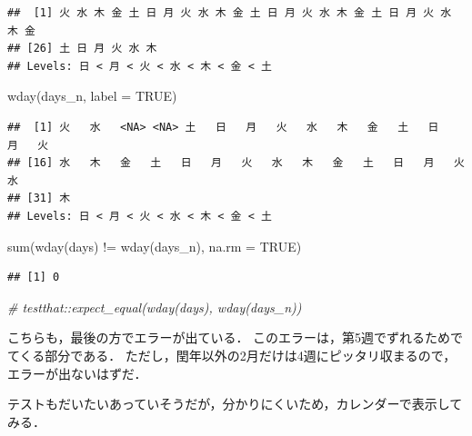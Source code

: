 \documentclass[
]{article}
\newenvironment{Shaded}{\begin{snugshade}}{\end{snugshade}}
\newcommand{\AttributeTok}[1]{\textcolor[rgb]{0.77,0.63,0.00}{#1}}
\newcommand{\CommentTok}[1]{\textcolor[rgb]{0.56,0.35,0.01}{\textit{#1}}}
\newcommand{\ConstantTok}[1]{\textcolor[rgb]{0.00,0.00,0.00}{#1}}
\newcommand{\FunctionTok}[1]{\textcolor[rgb]{0.00,0.00,0.00}{#1}}
\newcommand{\NormalTok}[1]{#1}
\newcommand{\SpecialCharTok}[1]{\textcolor[rgb]{0.00,0.00,0.00}{#1}}
\begin{document}
\begin{verbatim}
##  [1] 火 水 木 金 土 日 月 火 水 木 金 土 日 月 火 水 木 金 土 日 月 火 水 木 金
## [26] 土 日 月 火 水 木
## Levels: 日 < 月 < 火 < 水 < 木 < 金 < 土
\end{verbatim}

\begin{Shaded}
\begin{Highlighting}[]
\FunctionTok{wday}\NormalTok{(days\_n, }\AttributeTok{label =} \ConstantTok{TRUE}\NormalTok{)}
\end{Highlighting}
\end{Shaded}

\begin{verbatim}
##  [1] 火   水   <NA> <NA> 土   日   月   火   水   木   金   土   日   月   火  
## [16] 水   木   金   土   日   月   火   水   木   金   土   日   月   火   水  
## [31] 木  
## Levels: 日 < 月 < 火 < 水 < 木 < 金 < 土
\end{verbatim}

\begin{Shaded}
\begin{Highlighting}[]
\FunctionTok{sum}\NormalTok{(}\FunctionTok{wday}\NormalTok{(days) }\SpecialCharTok{!=} \FunctionTok{wday}\NormalTok{(days\_n), }\AttributeTok{na.rm =} \ConstantTok{TRUE}\NormalTok{)}
\end{Highlighting}
\end{Shaded}

\begin{verbatim}
## [1] 0
\end{verbatim}

\begin{Shaded}
\begin{Highlighting}[]
  \CommentTok{\# testthat::expect\_equal(wday(days), wday(days\_n))}
\end{Highlighting}
\end{Shaded}

こちらも，最後の方でエラーが出ている．
このエラーは，第5週でずれるためでてくる部分である．
ただし，閏年以外の2月だけは4週にピッタリ収まるので，エラーが出ないはずだ．

テストもだいたいあっていそうだが，分かりにくいため，カレンダーで表示してみる．
\end{document}
